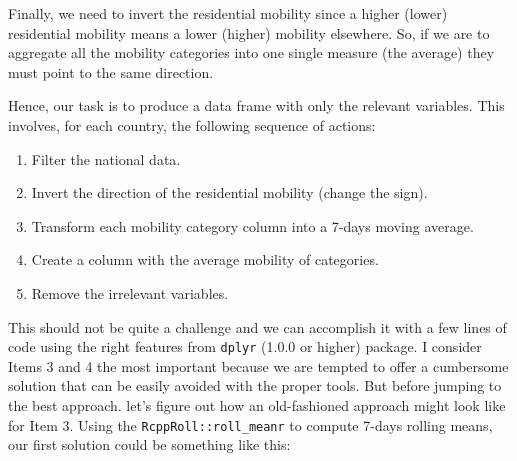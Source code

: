 \documentclass[
]{book}
\providecommand{\tightlist}{%
  \setlength{\itemsep}{0pt}\setlength{\parskip}{0pt}}
\begin{document}
Finally, we need to invert the residential mobility since a higher (lower) residential mobility means a lower (higher) mobility elsewhere. So, if we are to aggregate all the mobility categories into one single measure (the average) they must point to the same direction.

Hence, our task is to produce a data frame with only the relevant variables. This involves, for each country, the following sequence of actions:

\begin{enumerate}
\def\labelenumi{\arabic{enumi}.}
\tightlist
\item
  Filter the national data.
\item
  Invert the direction of the residential mobility (change the sign).
\item
  Transform each mobility category column into a 7-days moving average.
\item
  Create a column with the average mobility of categories.
\item
  Remove the irrelevant variables.
\end{enumerate}

This should not be quite a challenge and we can accomplish it with a few lines of code using the right features from \texttt{dplyr} (1.0.0 or higher) package. I consider Items 3 and 4 the most important because we are tempted to offer a cumbersome solution that can be easily avoided with the proper tools. But before jumping to the best approach. let's figure out how an old-fashioned approach might look like for Item 3. Using the \texttt{RcppRoll::roll\_meanr} to compute 7-days rolling means, our first solution could be something like this:
\end{document}
